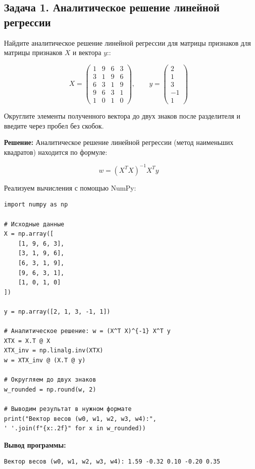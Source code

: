 \documentclass[pract]{SCWorks}
\begin{document}
\subsection*{Задача 1. Аналитическое решение линейной регрессии}

Найдите аналитическое решение линейной регрессии для матрицы признаков для матрицы признаков $X$ и вектора $y$::

\[
X = \begin{pmatrix}
1 & 9 & 6 & 3 \\
3 & 1 & 9 & 6 \\
6 & 3 & 1 & 9 \\
9 & 6 & 3 & 1 \\
1 & 0 & 1 & 0
\end{pmatrix}, \qquad 
y = \begin{pmatrix} 2 \\ 1 \\ 3 \\ -1 \\ 1 \end{pmatrix}
\]

Округлите элементы полученного вектора до двух знаков после разделителя и введите через пробел без скобок.

\textbf{Решение:} Аналитическое решение линейной регрессии (метод наименьших квадратов) находится по формуле:

\[
w = (X^T X)^{-1} X^T y
\]

Реализуем вычисления с помощью NumPy:

\begin{verbatim}
import numpy as np

# Исходные данные
X = np.array([
    [1, 9, 6, 3],
    [3, 1, 9, 6],
    [6, 3, 1, 9],
    [9, 6, 3, 1],
    [1, 0, 1, 0]
])

y = np.array([2, 1, 3, -1, 1])

# Аналитическое решение: w = (X^T X)^{-1} X^T y
XTX = X.T @ X
XTX_inv = np.linalg.inv(XTX)
w = XTX_inv @ (X.T @ y)

# Округляем до двух знаков
w_rounded = np.round(w, 2)

# Выводим результат в нужном формате
print("Вектор весов (w0, w1, w2, w3, w4):",
' '.join(f"{x:.2f}" for x in w_rounded))
\end{verbatim}

\textbf{Вывод программы:}

\begin{verbatim}
Вектор весов (w0, w1, w2, w3, w4): 1.59 -0.32 0.10 -0.20 0.35
\end{verbatim}
\end{document}
